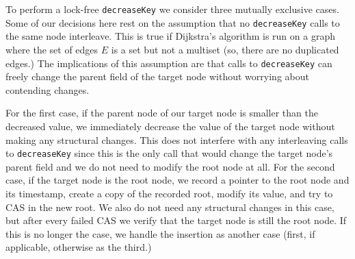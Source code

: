 \documentclass{acm_proc_article-sp}
\begin{document}
To perform a lock-free \texttt{decreaseKey} we consider three mutually exclusive cases.
Some of our decisions here rest on the assumption that no \texttt{decreaseKey} calls to the
same node interleave. This is true if Dijkstra's algorithm is run on a graph where the set
of edges $E$ is a set but not a multiset (so, there are no duplicated edges.) The implications
of this assumption are that calls to \texttt{decreaseKey} can freely change the parent field of the
target node without worrying about contending changes.

For the first case, 
if the parent node of our target node is smaller than the decreased value, we immediately decrease
the value of the target node without making any structural changes. This does not interfere with
any interleaving calls to \texttt{decreaseKey} since this is the only call that would change
the target node's parent field and we do not need to modify the root node at all.
For the second case, if the target node is the root node, we record a pointer to the root node and its timestamp, create
a copy of the recorded root, modify its value, and try to CAS in the new root. 
We also do not need any structural changes in this case, but
after every failed CAS we verify that the target node is still the root node. If this is no longer the case,
we handle the insertion as another case (first, if applicable, otherwise as the third.)

\end{document}
